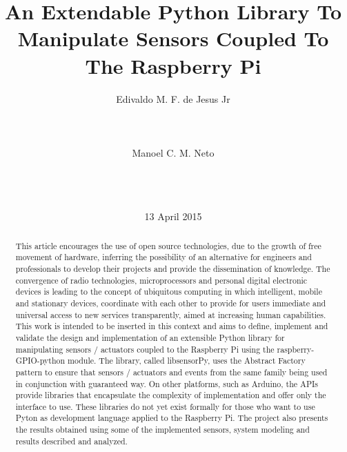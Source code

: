 \documentclass{acm_proc_article-sp}
\begin{document}
\thispagestyle{empty}

\title{An Extendable Python Library To Manipulate Sensors Coupled To The Raspberry Pi}

\author{
\alignauthor
Edivaldo M. F. de Jesus Jr\\
       \\
       \\
       \\
\alignauthor
Manoel C. M. Neto\\
       \\
       \\
       \\
}

\date{13 April 2015}

\maketitle
\begin{abstract}

This article encourages the use of open source technologies, due to the growth of free movement of hardware, inferring the possibility of an alternative for engineers and professionals to develop their projects and provide the dissemination of knowledge.
The convergence of radio technologies, microprocessors and personal digital electronic devices is leading to the concept of ubiquitous computing in which intelligent, mobile and stationary devices, coordinate with each other to provide for users immediate and universal access to new services transparently, aimed at increasing human capabilities. This work is intended to be inserted in this context and aims to define, implement and validate the design and implementation of an extensible Python library for manipulating sensors / actuators coupled to the Raspberry Pi using the raspberry-GPIO-python module. The library, called libsensorPy, uses the Abstract Factory pattern to ensure that sensors / actuators and events from the same family being used in conjunction with guaranteed way. On other platforms, such as Arduino, the APIs provide libraries that encapsulate the complexity of implementation and offer only the interface to use. These libraries do not yet exist formally for those who want to use Pyton as development language applied to the Raspberry Pi.  The project also presents the results obtained using some of the implemented sensors, system modeling and results described and analyzed.

\end{abstract}
\end{document}
